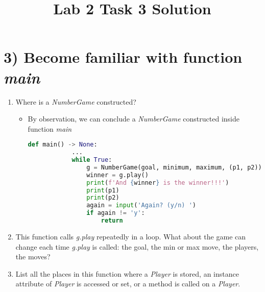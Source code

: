 \documentclass[12pt]{article}
\begin{document}
\title{Lab 2 Task 3 Solution}
\date{}
\maketitle


\section*{3) Become familiar with function \textit{main}}
\begin{enumerate}[1.]
    \item Where is a \textit{NumberGame} constructed?

    \begin{itemize}
        \item
        By observation, we can conclude a \textit{NumberGame} constructed
        inside function \textit{main}

        \begin{lstlisting}[language=Python]
        def main() -> None:
            ...
            while True:
                g = NumberGame(goal, minimum, maximum, (p1, p2)) #<- Here!!
                winner = g.play()
                print(f'And {winner} is the winner!!!')
                print(p1)
                print(p2)
                again = input('Again? (y/n) ')
                if again != 'y':
                    return

        \end{lstlisting}
    \end{itemize}

    \item This function calls \textit{g.play} repeatedly in a loop. What about the
    game can change each time \textit{g.play} is called: the goal, the min or max
    move, the players, the moves?
    \item List all the places in this function where a \textit{Player} is stored,
    an instance attribute of \textit{Player} is accessed or set, or a method is
    called on a \textit{Player}.
\end{enumerate}
\end{document}
